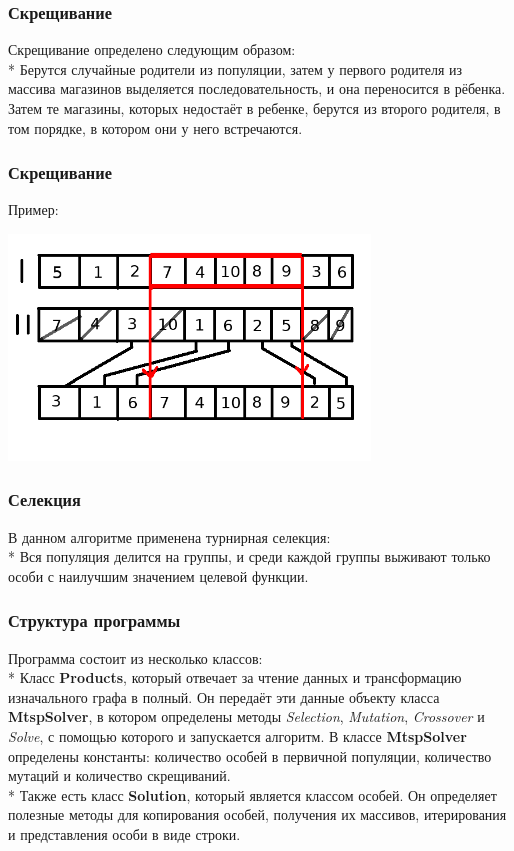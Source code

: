 \documentclass{beamer}
\begin{document}
\begin{frame}
    \frametitle{Скрещивание}
    Скрещивание определено следующим образом:\\*
    Берутся случайные родители из популяции, затем у первого родителя
    из массива магазинов выделяется последовательность, и она
    переносится в рёбенка. Затем те магазины, которых недостаёт в 
    ребенке, берутся из второго родителя, в том порядке, в котором они у 
    него встречаются.
\end{frame}
\begin{frame}
    \frametitle{Скрещивание}
    Пример:
    
    \begin{center}
        \includegraphics[height=6cm]{crossover.png}
    \end{center}
\end{frame}
\begin{frame}
    \frametitle{Селекция}
    В данном алгоритме применена турнирная селекция:\\*
    Вся популяция делится на группы, и среди каждой группы
    выживают только особи с наилучшим значением целевой функции.
\end{frame}
\begin{frame}
    \frametitle{Структура программы}
    Программа состоит из несколько классов:\\*
    Класс \textbf{Products}, который отвечает за чтение данных и
    трансформацию изначального графа в полный. Он передаёт эти данные
    объекту класса
    \textbf{MtspSolver}, в котором определены методы
    \textit{Selection}, \textit{Mutation},
    \textit{Crossover} и \textit{Solve}, с помощью которого и запускается алгоритм.
    В классе \textbf{MtspSolver} определены константы: количество
    особей в первичной популяции, количество мутаций и количество
    скрещиваний. \\*
    Также есть класс \textbf{Solution}, который является классом особей.
    Он определяет полезные методы для копирования особей, получения 
    их массивов, итерирования и представления особи в виде строки.
\end{frame}
\end{document}

